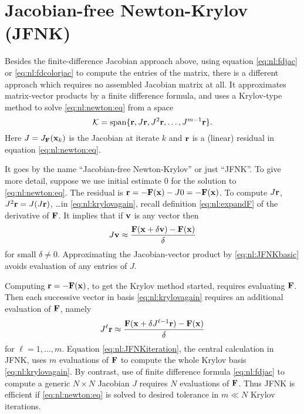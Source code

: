 

\section{Jacobian-free Newton-Krylov (JFNK)} \label{sec:JFNK}

Besides the finite-difference Jacobian approach above, using equation \eqref{eq:nl:fdjac} or \eqref{eq:nl:fdcolorjac} to compute the entries of the matrix, there is a different approach which requires no assembled Jacobian matrix at all.  It approximates matrix-vector products by a finite difference formula, and uses a Krylov-type method to solve \eqref{eq:nl:newton:eq} from a space
\begin{equation}
    \mathcal{K} = \operatorname{span}\{\mathbf{r},J\mathbf{r},J^2\mathbf{r},\dots,J^{m-1}\mathbf{r}\}. \label{eq:nl:krylovagain}
\end{equation}
Here $J=J_{\mathbf{F}}(\mathbf{x}_k)$ is the Jacobian at iterate $k$ and $\mathbf{r}$ is a (linear) residual in equation \eqref{eq:nl:newton:eq}.

It goes by the name ``Jacobian-free Newton-Krylov'' \citep{KnollKeyes2004} or just ``JFNK''.  To give more detail, suppose we use initial estimate $0$ for the solution to \eqref{eq:nl:newton:eq}.  The residual is $\mathbf{r} = - \mathbf{F}(\mathbf{x}) - J 0 = - \mathbf{F}(\mathbf{x})$.  To compute $J\mathbf{r}$, $J^2\mathbf{r}=J(J\mathbf{r})$, \dots in \eqref{eq:nl:krylovagain}, recall definition \eqref{eq:nl:expandF} of the derivative of $\mathbf{F}$.  It implies that if $\mathbf{v}$ is any vector then
\begin{equation}
J \mathbf{v} \approx \frac{\mathbf{F}(\mathbf{x}+\delta \mathbf{v}) - \mathbf{F}(\mathbf{x})}{\delta} \label{eq:nl:JFNKbasic}
\end{equation}
for small $\delta \ne 0$.  Approximating the Jacobian-vector product by \eqref{eq:nl:JFNKbasic} avoids evaluation of any entries of $J$.

Computing $\mathbf{r} = - \mathbf{F}(\mathbf{x})$, to get the Krylov method started, requires evaluating $\mathbf{F}$.  Then each successive vector in basis \eqref{eq:nl:krylovagain} requires an additional evaluation of $\mathbf{F}$, namely
\begin{equation}
J^{\ell} \mathbf{r} \approx \frac{\mathbf{F}(\mathbf{x}+\delta J^{\ell-1}\mathbf{r}) - \mathbf{F}(\mathbf{x})}{\delta} \label{eq:nl:JFNKiteration}
\end{equation}
for $\ell=1,\dots,m$.  Equation \eqref{eq:nl:JFNKiteration}, the central calculation in JFNK, uses $m$ evaluations of $\mathbf{F}$ to compute the whole Krylov basis \eqref{eq:nl:krylovagain}.  By contrast, use of finite difference formula \eqref{eq:nl:fdjac} to compute a generic $N\times N$ Jacobian $J$ requires $N$ evaluations of $\mathbf{F}$.  Thus JFNK is efficient if \eqref{eq:nl:newton:eq} is solved to desired tolerance in $m\ll N$ Krylov iterations.

